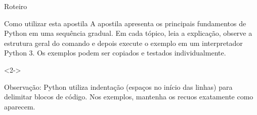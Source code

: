 \EMASCtitlepage{\inserttitle}

\begin{frame}[t]{Roteiro}
\vspace{3mm}
\tableofcontents[hideallsubsections]
\end{frame}

\begin{frame}[t]{Como utilizar esta apostila}
A apostila apresenta os principais fundamentos de Python em uma sequência gradual. Em cada tópico, leia a explicação, observe a estrutura geral do comando e depois execute o exemplo em um interpretador Python 3. Os exemplos podem ser copiados e testados individualmente.\par
\begin{visibleenv}<2->
\begin{EMASCnote}
Observação: Python utiliza indentação (espaços no início das linhas) para delimitar blocos de código. Nos exemplos, mantenha os recuos exatamente como aparecem.
\end{EMASCnote}
\end{visibleenv}
\end{frame}
